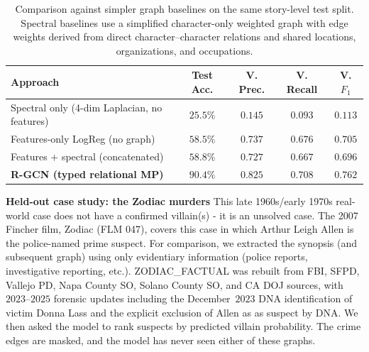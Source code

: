 \documentclass[11pt]{article}
\begin{document}
\begin{table}[h]
\centering
\small
\caption{Comparison against simpler graph baselines on the same story-level test split. Spectral baselines use a simplified character-only weighted graph with edge weights derived from direct character--character relations and shared locations, organizations, and occupations.}
\label{tab:ablation}
\begin{tabular}{lcccc}
\toprule
\textbf{Approach} & \textbf{Test Acc.} & \textbf{V. Prec.} & \textbf{V. Recall} & \textbf{V. $F_1$} \\
\midrule
Spectral only (4-dim Laplacian, no features) & $25.5\%$ & $0.145$ & $0.093$ & $0.113$ \\
Features-only LogReg (no graph) & $58.5\%$ & $0.737$ & $0.676$ & $0.705$ \\
Features $+$ spectral (concatenated) & $58.8\%$ & $0.727$ & $0.667$ & $0.696$ \\
\textbf{R-GCN (typed relational MP)} & $\mathbf{90.4\%}$ & $\mathbf{0.825}$ & $\mathbf{0.708}$ & $\mathbf{0.762}$ \\
\bottomrule
\end{tabular}
\end{table}

\textbf{Held-out case study: the Zodiac murders} This late 1960s/early 1970s real-world case does not have a confirmed villain(s) - it is an unsolved case. The 2007 Fincher film, Zodiac (FLM 047), covers this case in which Arthur Leigh Allen is the police-named prime suspect. For comparison, we extracted the synopsis (and subsequent graph) using only evidentiary information (police reports, investigative reporting, etc.). ZODIAC\_FACTUAL was rebuilt from FBI, SFPD, Vallejo PD, Napa County SO, Solano County SO, and CA DOJ sources, with $2023$--$2025$ forensic updates including the December~$2023$ DNA identification of victim Donna Lass and the explicit exclusion of Allen as as suspect by DNA. We then asked the model to rank suspects by predicted villain probability.  The crime edges are masked, and the model has never seen either of these graphs.  
\end{document}
